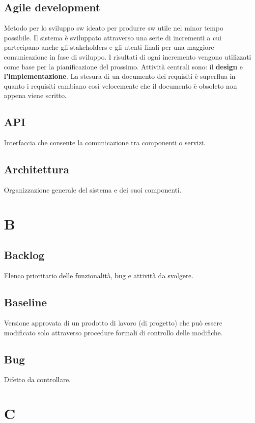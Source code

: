 \documentclass[a4paper,12pt]{article}
\begin{document}
\subsection{Agile development}
Metodo per lo sviluppo sw ideato per produrre sw utile nel minor tempo possibile. Il sistema è sviluppato attraverso una serie di incrementi a cui partecipano anche gli stakeholders e gli utenti finali per una maggiore comunicazione in fase di sviluppo. I risultati di ogni incremento vengono utilizzati come base per la pianificazione del prossimo.  
Attività centrali sono: il \textbf{design} e \textbf{l'implementazione}.  
La stesura di un documento dei requisiti è superflua in quanto i requisiti cambiano così velocemente che il documento è obsoleto non appena viene scritto.

\subsection{API}
Interfaccia che consente la comunicazione tra componenti o servizi.

\subsection{Architettura}
Organizzazione generale del sistema e dei suoi componenti.

\section{B}

\subsection{Backlog}
Elenco prioritario delle funzionalità, bug e attività da svolgere.

\subsection{Baseline}
Versione approvata di un prodotto di lavoro (di progetto) che può essere modificato solo attraverso procedure formali di controllo delle modifiche.

\subsection{Bug}
Difetto da controllare.

\section{C}
\end{document}
